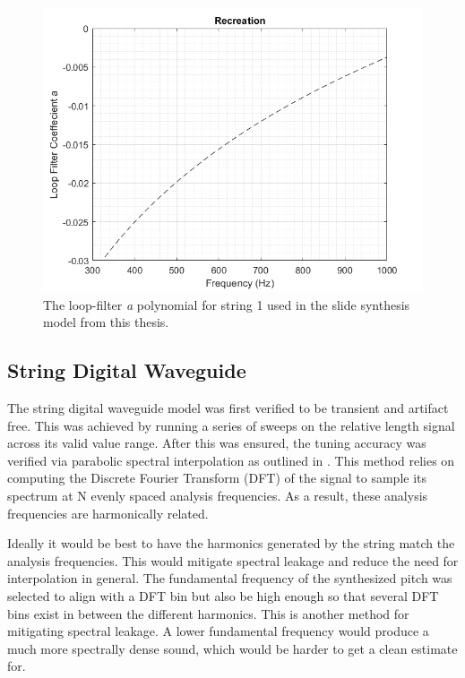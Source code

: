 \documentclass[../main.tex]{subfiles}
\begin{document}
\begin{figure}[h]
    \centering
    \includegraphics[scale=.65]{./images/plots/Figure19Recon.png}
    \caption{The loop-filter \emph{a} polynomial for string 1 used in the slide synthesis model from this thesis.}
    \label{fig:Fig19Recon}
\end{figure}

\clearpage

\subsection{String Digital Waveguide}
The string digital waveguide model was first verified to be transient and artifact free. This was achieved by running a series of sweeps on the relative length signal across its valid value range. After this was ensured, the tuning accuracy was verified via parabolic spectral interpolation as outlined in . This method relies on computing the Discrete Fourier Transform (DFT) of the signal to sample its spectrum at N evenly spaced analysis frequencies. As a result, these analysis frequencies are harmonically related.

Ideally it would be best to have the harmonics generated by the string match the analysis frequencies. This would mitigate spectral leakage and reduce the need for interpolation in general. The fundamental frequency of the synthesized pitch was selected to align with a DFT bin but also be high enough so that several DFT bins exist in between the different harmonics. This is another method for mitigating spectral leakage. A lower fundamental frequency would produce a much more spectrally dense sound, which would be harder to get a clean estimate for.
\end{document}
